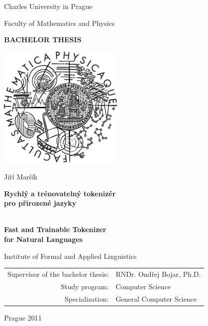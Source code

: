 

\pagestyle{empty}
\begin{center}

\large

Charles University in Prague

\medskip

Faculty of Mathematics and Physics

\vfill

{\bf\Large BACHELOR THESIS}

\vfill

\centerline{\mbox{\includegraphics[width=60mm]{img/logo.eps}}}

\vfill
\vspace{5mm}

{\LARGE Jiří Maršík}

\vspace{15mm}

\begin{otherlanguage}{czech}
{\LARGE\bfseries Rychlý a trénovatelný tokenizér \\ pro přirozené jazyky}
\end{otherlanguage}
\\
{\LARGE\bfseries Fast and Trainable Tokenizer \\ for Natural Languages}

\vfill

Institute of Formal and Applied Linguistics

\vfill

\begin{tabular}{rl}

Supervisor of the bachelor thesis: & RNDr. Ondřej Bojar, Ph.D. \\
\noalign{\vspace{2mm}}
Study program: & Computer Science \\
\noalign{\vspace{2mm}}
Specialization: & General Computer Science \\
\end{tabular}

\vfill

Prague 2011

\end{center}

